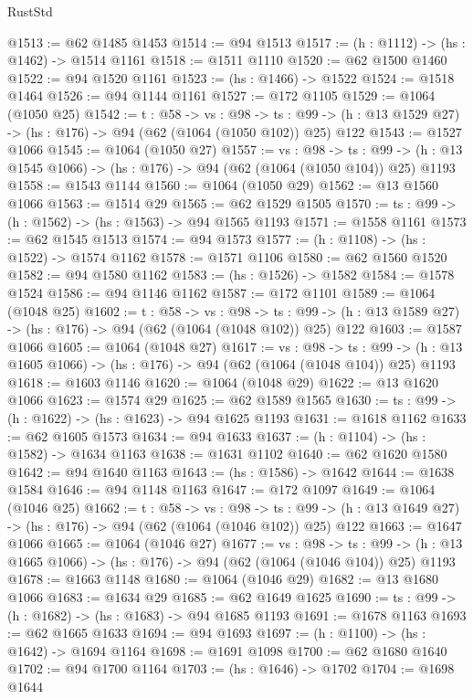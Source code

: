 \begin{lexlean}{RustStd}
\begin{coremodule}
{\begin{coremodule}
{{{{{{@1513 := @62 @1485 @1453
@1514 := @94 @1513
@1517 := (h : @1112) -> (hs : @1462) -> @1514 @1161
@1518 := @1511 @1110
@1520 := @62 @1500 @1460
@1522 := @94 @1520 @1161
@1523 := (hs : @1466) -> @1522
@1524 := @1518 @1464
@1526 := @94 @1144 @1161
@1527 := @172 @1105
@1529 := @1064 (@1050 @25)
@1542 := {t : @58} ->
  {vs : @98} ->
  {ts : @99} -> (h : @13 @1529 @27) -> (hs : @176) -> @94 (@62 (@1064 (@1050 @102)) @25) @122
@1543 := @1527 @1066
@1545 := @1064 (@1050 @27)
@1557 := {vs : @98} ->
  {ts : @99} -> (h : @13 @1545 @1066) -> (hs : @176) -> @94 (@62 (@1064 (@1050 @104)) @25) @1193
@1558 := @1543 @1144
@1560 := @1064 (@1050 @29)
@1562 := @13 @1560 @1066
@1563 := @1514 @29
@1565 := @62 @1529 @1505
@1570 := {ts : @99} -> (h : @1562) -> (hs : @1563) -> @94 @1565 @1193
@1571 := @1558 @1161
@1573 := @62 @1545 @1513
@1574 := @94 @1573
@1577 := (h : @1108) -> (hs : @1522) -> @1574 @1162
@1578 := @1571 @1106
@1580 := @62 @1560 @1520
@1582 := @94 @1580 @1162
@1583 := (hs : @1526) -> @1582
@1584 := @1578 @1524
@1586 := @94 @1146 @1162
@1587 := @172 @1101
@1589 := @1064 (@1048 @25)
@1602 := {t : @58} ->
  {vs : @98} ->
  {ts : @99} -> (h : @13 @1589 @27) -> (hs : @176) -> @94 (@62 (@1064 (@1048 @102)) @25) @122
@1603 := @1587 @1066
@1605 := @1064 (@1048 @27)
@1617 := {vs : @98} ->
  {ts : @99} -> (h : @13 @1605 @1066) -> (hs : @176) -> @94 (@62 (@1064 (@1048 @104)) @25) @1193
@1618 := @1603 @1146
@1620 := @1064 (@1048 @29)
@1622 := @13 @1620 @1066
@1623 := @1574 @29
@1625 := @62 @1589 @1565
@1630 := {ts : @99} -> (h : @1622) -> (hs : @1623) -> @94 @1625 @1193
@1631 := @1618 @1162
@1633 := @62 @1605 @1573
@1634 := @94 @1633
@1637 := (h : @1104) -> (hs : @1582) -> @1634 @1163
@1638 := @1631 @1102
@1640 := @62 @1620 @1580
@1642 := @94 @1640 @1163
@1643 := (hs : @1586) -> @1642
@1644 := @1638 @1584
@1646 := @94 @1148 @1163
@1647 := @172 @1097
@1649 := @1064 (@1046 @25)
@1662 := {t : @58} ->
  {vs : @98} ->
  {ts : @99} -> (h : @13 @1649 @27) -> (hs : @176) -> @94 (@62 (@1064 (@1046 @102)) @25) @122
@1663 := @1647 @1066
@1665 := @1064 (@1046 @27)
@1677 := {vs : @98} ->
  {ts : @99} -> (h : @13 @1665 @1066) -> (hs : @176) -> @94 (@62 (@1064 (@1046 @104)) @25) @1193
@1678 := @1663 @1148
@1680 := @1064 (@1046 @29)
@1682 := @13 @1680 @1066
@1683 := @1634 @29
@1685 := @62 @1649 @1625
@1690 := {ts : @99} -> (h : @1682) -> (hs : @1683) -> @94 @1685 @1193
@1691 := @1678 @1163
@1693 := @62 @1665 @1633
@1694 := @94 @1693
@1697 := (h : @1100) -> (hs : @1642) -> @1694 @1164
@1698 := @1691 @1098
@1700 := @62 @1680 @1640
@1702 := @94 @1700 @1164
@1703 := (hs : @1646) -> @1702
@1704 := @1698 @1644
}}}}}}
\end{coremodule}}
\end{coremodule}
\end{lexlean}
